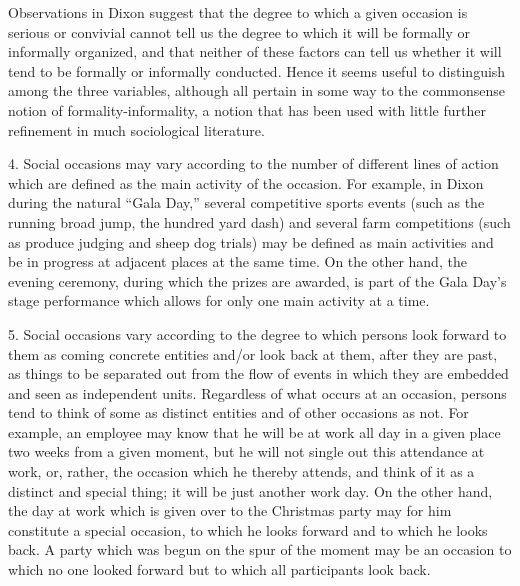 \documentclass[twoside,symmetric,nobib,justified]{tufte-book}
\begin{document}
Observations in Dixon suggest that the degree to which a given occasion
is serious or convivial cannot tell us the degree to which it will be
formally or informally organized, and that neither of these factors can
tell us whether it will tend to be formally or informally conducted.
Hence it seems useful to distinguish among the three variables, although
all pertain in some way to the commonsense notion of
formality-informality, a notion that has been used with little further
refinement in much sociological literature.

4. Social occasions may vary according to the number of different lines
of action which are defined as the main activity of the occasion. For
example, in Dixon during the natural ``Gala Day,'' several competitive
sports events (such as the running broad jump, the hundred yard dash)
and several farm competitions (such as produce judging and sheep dog
trials) may be defined as main activities and be in progress at adjacent
places at the same time. On the other hand, the evening ceremony, during
which the prizes are awarded, is part of the Gala Day's stage
performance which allows for only one main activity at a time.

5. Social occasions vary according to the degree to which persons look
forward to them as coming concrete entities and/or look back at them,
after they are past, as things to be separated out from the flow of
events in which they are embedded and seen as independent units.
Regardless of what occurs at an occasion, persons tend to think of some
as distinct entities and of other occasions as not. For example, an
employee may know that he will be at work all day in a given place two
weeks from a given moment, but he will not single out this attendance at
work, or, rather, the occasion which he thereby attends, and think of it
as a distinct and special thing; it will be just another work day. On
the other hand, the day at work which is given over to the Christmas
party may for him constitute a special occasion, to which he looks
forward and to which he looks back. A party which was begun on the spur
of the moment may be an occasion to which no one looked forward but to
which all participants look back.
\end{document}
